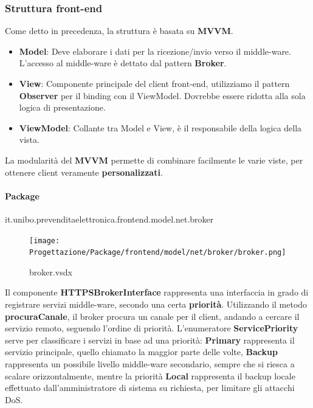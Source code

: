 \documentclass[a4paper]{article}
\begin{document}
\subsubsection{Struttura front-end}

Come detto in precedenza, la struttura è basata su \textbf{MVVM}.

\begin{itemize}
    \item \textbf{Model}: Deve elaborare i dati per la ricezione/invio verso il middle-ware.\\L'accesso al middle-ware è dettato dal pattern \textbf{Broker}.
    \item \textbf{View}: Componente principale del client front-end, utilizziamo il pattern \textbf{Observer} per il binding con il ViewModel. Dovrebbe essere ridotta alla sola logica di presentazione.
    \item \textbf{ViewModel}: Collante tra Model e View, è il responsabile della logica della vista.
\end{itemize}

La modularità del \textbf{MVVM} permette di combinare facilmente le varie viste, per ottenere client veramente \textbf{personalizzati}.

\paragraph{Package}it.unibo.prevenditaelettronica.frontend.model.net.broker


\begin{figure}[H]
    \texttt{[image: Progettazione/Package/frontend/model/net/broker/broker.png]}
    \centering
    \caption{broker.vsdx}
\end{figure}

Il componente \textbf{HTTPSBrokerInterface} rappresenta una interfaccia in grado di registrare servizi middle-ware, secondo una certa \textbf{priorità}. Utilizzando il metodo \textbf{procuraCanale}, il broker procura un canale per il client, andando a cercare il servizio remoto, seguendo l'ordine di priorità. L'enumeratore \textbf{ServicePriority} serve per classificare i servizi in base ad una priorità: \textbf{Primary} rappresenta il servizio principale, quello chiamato la maggior parte delle volte, \textbf{Backup} rappresenta un possibile livello middle-ware secondario, sempre che si riesca a scalare orizzontalmente, mentre la priorità \textbf{Local} rappresenta il backup locale effettuato dall'amministratore di sistema su richiesta, per limitare gli attacchi DoS.
\end{document}
